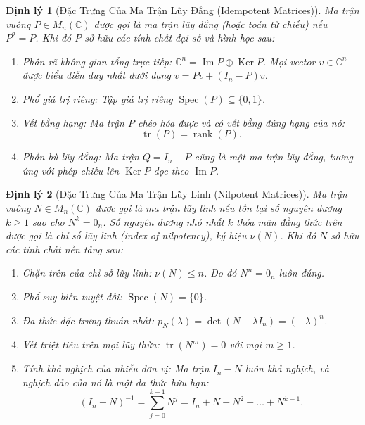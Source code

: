 \documentclass{article}
\newtheorem{dinhly}{Định lý}
\begin{document}
\begin{dinhly}[Đặc Trưng Của Ma Trận Lũy Đẳng (Idempotent Matrices)]
Ma trận vuông $P \in M_n(\mathbb{C})$ được gọi là ma trận lũy đẳng (hoặc toán tử chiếu) nếu $P^2 = P$.
Khi đó $P$ sở hữu các tính chất đại số và hình học sau:
\begin{enumerate}
    \item \emph{Phân rã không gian tổng trực tiếp:} $\mathbb{C}^n = \operatorname{Im} P \oplus \operatorname{Ker} P$. Mọi vector $v \in \mathbb{C}^n$ được biểu diễn duy nhất dưới dạng $v = P v + (I_n - P) v$.
    \item \emph{Phổ giá trị riêng:} Tập giá trị riêng $\operatorname{Spec}(P) \subseteq \{0, 1\}$.
    \item \emph{Vết bằng hạng:} Ma trận $P$ chéo hóa được và có vết bằng đúng hạng của nó:
    \begin{equation}
        \operatorname{tr}(P) = \operatorname{rank}(P).
    \end{equation}
    \item \emph{Phần bù lũy đẳng:} Ma trận $Q = I_n - P$ cũng là một ma trận lũy đẳng, tương ứng với phép chiếu lên $\operatorname{Ker} P$ dọc theo $\operatorname{Im} P$.
\end{enumerate}
\end{dinhly}

\begin{dinhly}[Đặc Trưng Của Ma Trận Lũy Linh (Nilpotent Matrices)]
Ma trận vuông $N \in M_n(\mathbb{C})$ được gọi là ma trận lũy linh nếu tồn tại số nguyên dương $k \ge 1$ sao cho $N^k = 0_n$. Số nguyên dương nhỏ nhất $k$ thỏa mãn đẳng thức trên được gọi là chỉ số lũy linh (index of nilpotency), ký hiệu $\nu(N)$.
Khi đó $N$ sở hữu các tính chất nền tảng sau:
\begin{enumerate}
    \item \emph{Chặn trên của chỉ số lũy linh:} $\nu(N) \le n$. Do đó $N^n = 0_n$ luôn đúng.
    \item \emph{Phổ suy biến tuyệt đối:} $\operatorname{Spec}(N) = \{0\}$.
    \item \emph{Đa thức đặc trưng thuần nhất:} $p_N(\lambda) = \det(N - \lambda I_n) = (-\lambda)^n$.
    \item \emph{Vết triệt tiêu trên mọi lũy thừa:} $\operatorname{tr}(N^m) = 0$ với mọi $m \ge 1$.
    \item \emph{Tính khả nghịch của nhiễu đơn vị:} Ma trận $I_n - N$ luôn khả nghịch, và nghịch đảo của nó là một đa thức hữu hạn:
    \begin{equation}
        (I_n - N)^{-1} = \sum_{j=0}^{k-1} N^j = I_n + N + N^2 + \dots + N^{k-1}.
    \end{equation}
\end{enumerate}
\end{dinhly}
\end{document}
